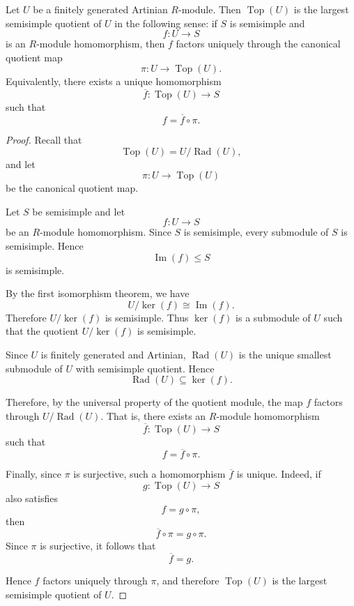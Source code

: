 \begin{corollary}
    Let $U$ be a finitely generated Artinian $R$-module. Then
    $\operatorname{Top}(U)$ is the largest semisimple quotient of $U$ in the following sense:
    if $S$ is semisimple and
    \[
        f:U\to S
    \]
    is an $R$-module homomorphism, then $f$ factors uniquely through the canonical
    quotient map
    \[
        \pi:U\to \operatorname{Top}(U).
    \]
    Equivalently, there exists a unique homomorphism
    \[
        \overline{f}:\operatorname{Top}(U)\to S
    \]
    such that
    \[
        f=\overline{f}\circ \pi.
    \]
\end{corollary}

\begin{proof}
    Recall that
    \[
        \operatorname{Top}(U)=U/\operatorname{Rad}(U),
    \]
    and let
    \[
        \pi:U\longrightarrow \operatorname{Top}(U)
    \]
    be the canonical quotient map.

    Let \(S\) be semisimple and let
    \[
        f:U\longrightarrow S
    \]
    be an \(R\)-module homomorphism. Since \(S\) is semisimple, every submodule of
    \(S\) is semisimple. Hence
    \[
        \operatorname{Im}(f)\leq S
    \]
    is semisimple.

    By the first isomorphism theorem, we have
    \[
        U/\ker(f)\cong \operatorname{Im}(f).
    \]
    Therefore \(U/\ker(f)\) is semisimple. Thus \(\ker(f)\) is a submodule of \(U\)
    such that the quotient \(U/\ker(f)\) is semisimple.

    Since \(U\) is finitely generated and Artinian, \(\operatorname{Rad}(U)\) is the
    unique smallest submodule of \(U\) with semisimple quotient. Hence
    \[
        \operatorname{Rad}(U)\subseteq \ker(f).
    \]

    Therefore, by the universal property of the quotient module, the map \(f\)
    factors through \(U/\operatorname{Rad}(U)\). That is, there exists an
    \(R\)-module homomorphism
    \[
        \overline{f}:\operatorname{Top}(U)\longrightarrow S
    \]
    such that
    \[
        f=\overline{f}\circ \pi.
    \]

    Finally, since \(\pi\) is surjective, such a homomorphism \(\overline{f}\) is
    unique. Indeed, if
    \[
        g:\operatorname{Top}(U)\longrightarrow S
    \]
    also satisfies
    \[
        f=g\circ \pi,
    \]
    then
    \[
        \overline{f}\circ \pi=g\circ \pi.
    \]
    Since \(\pi\) is surjective, it follows that
    \[
        \overline{f}=g.
    \]

    Hence \(f\) factors uniquely through \(\pi\), and therefore
    \(\operatorname{Top}(U)\) is the largest semisimple quotient of \(U\).
\end{proof}

